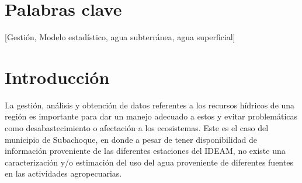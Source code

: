 \documentclass[draft]{agujournal2019}
\begin{document}
\section*{Palabras clave}
[Gestión, Modelo estadístico, agua subterránea, agua superficial]


%
%

%


%
%
%
%


\section{Introducción}
La gestión, análisis y obtención de datos referentes a los recursos hídricos de una región es importante para dar un manejo adecuado a estos y evitar problemáticas como desabastecimiento o afectación a los ecosistemas. Este es el caso del municipio de Subachoque, en donde a pesar de tener disponibilidad de información proveniente de las diferentes estaciones del IDEAM, no existe una caracterización y/o estimación del uso del agua proveniente de diferentes fuentes en las actividades agropecuarias. 
\end{document}
